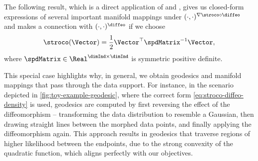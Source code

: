 The following result, which is a direct application of \cite[Prop.~2.1]{diepeveen2024pulling} and \cite[Cor.~3.6.1]{diepeveen2024pulling}, gives us closed-form expressions of several important manifold mappings under $(\cdot,\cdot)^{\nabla \stroco \circ \diffeo}$ and makes a connection with $(\cdot,\cdot)^{\diffeo}$ if we choose
\begin{equation}
    \stroco(\Vector)=\frac{1}{2} \Vector^{\top} \spdMatrix^{-1} \Vector,
    \label{eq:quadratic-stroco}
\end{equation}
where $\spdMatrix\in \Real^{\dimInd\times \dimInd}$ is symmetric positive definite. 

This special case highlights why, in general, we obtain geodesics and manifold mappings that pass through the data support. For instance, in the scenario depicted in \ref{fig:toy-example-geodesic}, where the correct form \ref{eq:stroco-diffeo-density} is used, geodesics are computed by first reversing the effect of the diffeomorphism -- transforming the data distribution to resemble a Gaussian, then drawing straight lines between the morphed data points, and finally applying the diffeomorphism again. This approach results in geodesics that traverse regions of higher likelihood between the endpoints, due to the strong convexity of the quadratic function, which aligns perfectly with our objectives.

